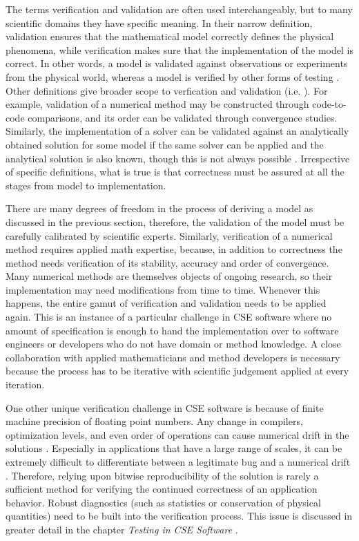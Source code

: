 The terms verification and validation are often used interchangeably,
but to many scientific domains they have specific meaning.   
In their narrow definition, validation ensures that the mathematical
model correctly defines the physical phenomena, while verification
makes sure that the implementation of the model is correct. In other
words, a model is validated against observations or experiments from
the physical world, whereas a model is verified by other forms of
testing \cite{oberkampf2002verification}.   Other definitions give
broader scope to  verfication and validation (i.e. \cite{sargent1998verification}). For
example, validation of a numerical method may be constructed through
code-to-code comparisons, and its order can be validated through
convergence studies. Similarly, the implementation of a solver can be
validated against an analytically obtained solution for some model if
the same solver can be applied and the analytical solution is also
known, though this is not always possible
\cite{oberkampf2010verification}.  Irrespective of  specific
definitions, what is true is that  
correctness must be assured at all the stages from model to
implementation.    

There are many degrees of freedom in the process of deriving a
model as discussed in the previous section, therefore, the validation of the
model must be carefully calibrated by scientific experts. Similarly,
verification of a numerical method requires applied math expertise,
because, in addition to correctness the method needs verification of its stability, accuracy and
order of convergence. Many numerical methods 
are themselves objects of ongoing research, so their
implementation may need modifications from time to time. Whenever
this happens, the entire gamut of verification and validation needs to
be applied again. This is an instance of a particular challenge in 
CSE software where no amount of specification is enough to hand the
implementation over to software engineers or developers who do not
have domain or method knowledge. A close collaboration with applied
mathematicians and method developers is necessary because the process
has to be iterative with scientific judgement applied at every
iteration.  

One other unique verification challenge in CSE software is because of
finite machine precision of floating point numbers. Any change in
compilers, optimization levels, and even order of operations can cause
numerical drift in the solutions
\cite{monniaux2008pitfalls}. Especially in applications that have a
large range of scales, it can be extremely difficult to differentiate
between a legitimate bug and a numerical drift \cite{Dubey2015}. Therefore, relying
upon bitwise reproducibility of the solution is rarely a sufficient
method for verifying the continued correctness of an application
behavior. Robust diagnostics (such as statistics or conservation of
physical quantities) need to be built into the verification process.
This issue is discussed in greater detail in the chapter {\em Testing
  in CSE Software} .  

